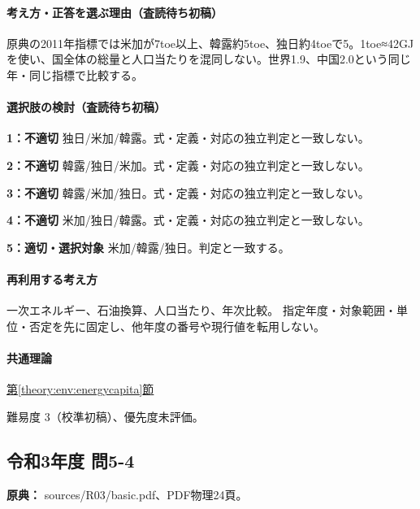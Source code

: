 \paragraph{考え方・正答を選ぶ理由（査読待ち初稿）} 原典の2011年指標では米加が7toe以上、韓露約5toe、独日約4toeで5。1toe≈42GJを使い、国全体の総量と人口当たりを混同しない。世界1.9、中国2.0という同じ年・同じ指標で比較する。

\paragraph{選択肢の検討（査読待ち初稿）}\mbox{}\par

\noindent\textbf{1：不適切} 独日/米加/韓露。式・定義・対応の独立判定と一致しない。\par

\noindent\textbf{2：不適切} 韓露/独日/米加。式・定義・対応の独立判定と一致しない。\par

\noindent\textbf{3：不適切} 韓露/米加/独日。式・定義・対応の独立判定と一致しない。\par

\noindent\textbf{4：不適切} 米加/独日/韓露。式・定義・対応の独立判定と一致しない。\par

\noindent\textbf{5：適切・選択対象} 米加/韓露/独日。判定と一致する。\par

\paragraph{再利用する考え方} 一次エネルギー、石油換算、人口当たり、年次比較。 指定年度・対象範囲・単位・否定を先に固定し、他年度の番号や現行値を転用しない。

\paragraph{共通理論} \hyperref[theory:env:energycapita]{第\ref*{theory:env:energycapita}節}

\par 難易度 3（校準初稿）、優先度未評価。

\subsection{令和3年度 問5-4}
\label{q:r03-reg-basic-5-4}

\noindent\textbf{原典：} sources/R03/basic.pdf、PDF物理24頁。

